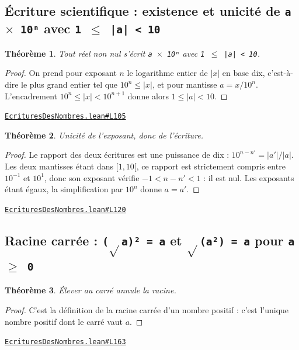 \documentclass[11pt,a4paper]{article}
\theoremstyle{definition}
\theoremstyle{plain}
\newtheorem{theoreme}{Théorème}
\newcommand{\source}[2]{\par\smallskip\noindent\hfill{\footnotesize\href{#1}{\texttt{#2}}}\par\smallskip}
\begin{document}
\subsection{Écriture scientifique : existence et unicité de \texttt{a \(\times\) 10ⁿ} avec \texttt{1 \(\le\) |a| < 10}}

\begin{theoreme}
Tout réel non nul s'écrit \texttt{a \(\times\) 10ⁿ} avec \texttt{1 \(\le\) |a| < 10}.
\end{theoreme}

\begin{proof}
On prend pour exposant $n$ le logarithme entier de $|x|$ en base dix, c'est-à-dire
le plus grand entier tel que $10^n \le |x|$, et pour mantisse $a = x / 10^n$. L'encadrement
$10^n \le |x| < 10^{n+1}$ donne alors $1 \le |a| < 10$.
\end{proof}
\source{https://github.com/Commutator-IO/learn-lean/blob/main/cours/01-college/01-nombres-et-calculs/EcrituresDesNombres.lean\#L105}{EcrituresDesNombres.lean\#L105}

\begin{theoreme}
Unicité de l'exposant, donc de l'écriture.
\end{theoreme}

\begin{proof}
Le rapport des deux écritures est une puissance de dix : $10^{n-n'} = |a'|/|a|$.
Les deux mantisses étant dans $[1, 10[$, ce rapport est strictement compris entre $10^{-1}$
et $10^{1}$, donc son exposant vérifie $-1 < n - n' < 1$ : il est nul. Les exposants étant
égaux, la simplification par $10^n$ donne $a = a'$.
\end{proof}
\source{https://github.com/Commutator-IO/learn-lean/blob/main/cours/01-college/01-nombres-et-calculs/EcrituresDesNombres.lean\#L120}{EcrituresDesNombres.lean\#L120}

\subsection{Racine carrée : \texttt{(\(\sqrt{}\)a)² = a} et \texttt{\(\sqrt{}\)(a²) = a} pour \texttt{a \(\ge\) 0}}

\begin{theoreme}
Élever au carré annule la racine.
\end{theoreme}

\begin{proof}
C'est la définition de la racine carrée d'un nombre positif : c'est l'unique
nombre positif dont le carré vaut $a$.
\end{proof}
\source{https://github.com/Commutator-IO/learn-lean/blob/main/cours/01-college/01-nombres-et-calculs/EcrituresDesNombres.lean\#L163}{EcrituresDesNombres.lean\#L163}
\end{document}
